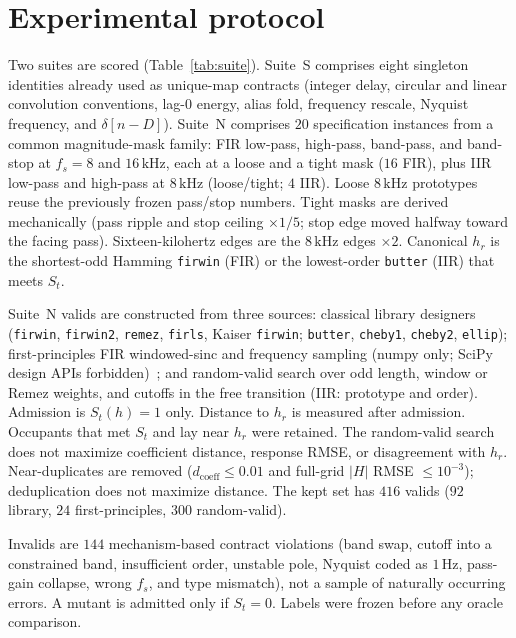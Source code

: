 \documentclass{article}
\begin{document}
\section{Experimental protocol}
\label{sec:protocol}

Two suites are scored (Table~\ref{tab:suite}).
Suite~S comprises eight singleton identities already used as
unique-map contracts (integer delay, circular and linear convolution
conventions, lag-$0$ energy, alias fold, frequency rescale, Nyquist
frequency, and $\delta[n-D]$).
Suite~N comprises $20$ specification instances from a common
magnitude-mask family: FIR low-pass, high-pass, band-pass, and
band-stop at $f_s=8$ and $16\,\mathrm{kHz}$, each at a loose and a
tight mask ($16$ FIR), plus IIR low-pass and high-pass at $8\,\mathrm{kHz}$
(loose/tight; $4$ IIR).
Loose $8\,\mathrm{kHz}$ prototypes reuse the previously frozen
pass/stop numbers.
Tight masks are derived mechanically (pass ripple and stop ceiling
$\times 1/5$; stop edge moved halfway toward the facing pass).
Sixteen-kilohertz edges are the $8\,\mathrm{kHz}$ edges $\times 2$.
Canonical $h_r$ is the shortest-odd Hamming \texttt{firwin} (FIR) or
the lowest-order \texttt{butter} (IIR) that meets $S_t$.

Suite~N valids are constructed from three sources: classical library
designers (\texttt{firwin}, \texttt{firwin2}, \texttt{remez},
\texttt{firls}, Kaiser \texttt{firwin}; \texttt{butter},
\texttt{cheby1}, \texttt{cheby2}, \texttt{ellip}); first-principles FIR
windowed-sinc and frequency sampling (numpy only; SciPy design APIs
forbidden)~\cite{kaiser1974window,rabiner1970freqsamp}; and
random-valid search over odd length, window or Remez weights, and
cutoffs in the free transition (IIR: prototype and order).
Admission is $S_t(h)=1$ only.
Distance to $h_r$ is measured after admission.
Occupants that met $S_t$ and lay near $h_r$ were retained.
The random-valid search does not maximize coefficient distance,
response RMSE, or disagreement with $h_r$.
Near-duplicates are removed
($d_{\mathrm{coeff}}\le 0.01$ and full-grid $\lvert H\rvert$ RMSE
$\le 10^{-3}$); deduplication does not maximize distance.
The kept set has $416$ valids ($92$ library, $24$ first-principles,
$300$ random-valid).

Invalids are $144$ mechanism-based contract violations (band swap,
cutoff into a constrained band, insufficient order, unstable pole,
Nyquist coded as $1\,\mathrm{Hz}$, pass-gain collapse, wrong $f_s$,
and type mismatch), not a sample of naturally occurring errors.
A mutant is admitted only if $S_t=0$.
Labels were frozen before any oracle comparison.
\end{document}
